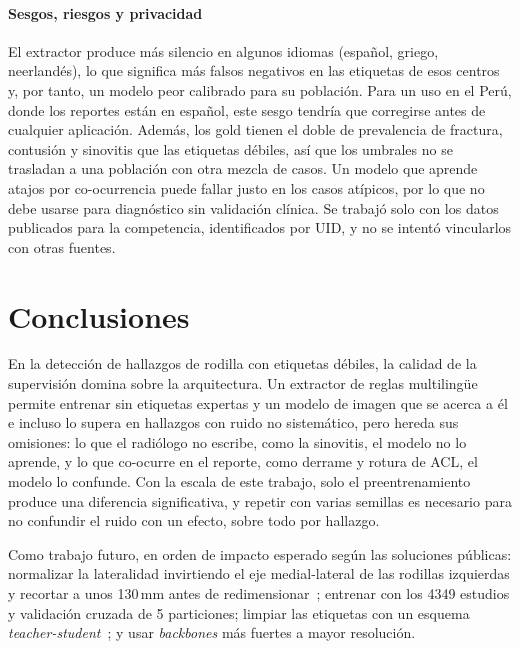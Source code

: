 \documentclass[conference]{IEEEtran}
\begin{document}
\paragraph*{Sesgos, riesgos y privacidad}
El extractor produce más silencio en algunos idiomas (español, griego, neerlandés), lo que significa más falsos negativos en las etiquetas de esos centros y, por tanto, un modelo peor calibrado para su población.
Para un uso en el Perú, donde los reportes están en español, este sesgo tendría que corregirse antes de cualquier aplicación.
Además, los gold tienen el doble de prevalencia de fractura, contusión y sinovitis que las etiquetas débiles, así que los umbrales no se trasladan a una población con otra mezcla de casos.
Un modelo que aprende atajos por co-ocurrencia puede fallar justo en los casos atípicos, por lo que no debe usarse para diagnóstico sin validación clínica.
Se trabajó solo con los datos publicados para la competencia, identificados por UID, y no se intentó vincularlos con otras fuentes.

\section{Conclusiones}
\label{sec:conclusiones}

En la detección de hallazgos de rodilla con etiquetas débiles, la calidad de la supervisión domina sobre la arquitectura.
Un extractor de reglas multilingüe permite entrenar sin etiquetas expertas y un modelo de imagen que se acerca a él e incluso lo supera en hallazgos con ruido no sistemático, pero hereda sus omisiones: lo que el radiólogo no escribe, como la sinovitis, el modelo no lo aprende, y lo que co-ocurre en el reporte, como derrame y rotura de ACL, el modelo lo confunde.
Con la escala de este trabajo, solo el preentrenamiento produce una diferencia significativa, y repetir con varias semillas es necesario para no confundir el ruido con un efecto, sobre todo por hallazgo.

Como trabajo futuro, en orden de impacto esperado según las soluciones públicas: normalizar la lateralidad invirtiendo el eje medial-lateral de las rodillas izquierdas y recortar a unos 130\,mm antes de redimensionar~\cite{pilkwang2026baseline}; entrenar con los 4349 estudios y validación cruzada de 5 particiones; limpiar las etiquetas con un esquema \emph{teacher-student}~\cite{ab29knee}; y usar \emph{backbones} más fuertes a mayor resolución.
\end{document}
